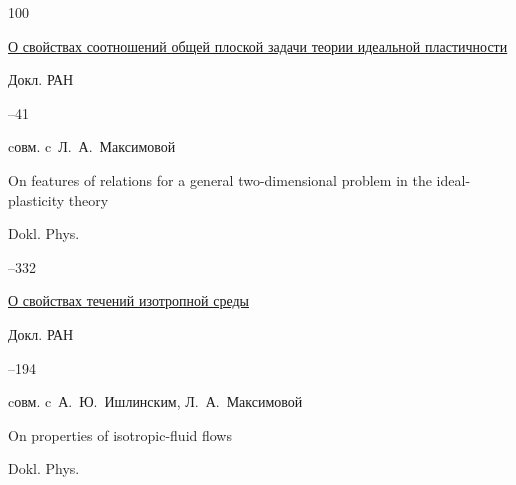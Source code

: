 \begin{thebibliography}{100}





\paper \href{http://mi.mathnet.ru/dan17870}{О свойствах соотношений общей плоской задачи теории идеальной пластичности}

\jour Докл. РАН




--41


\miscnote cовм. c~Л.~А.~Максимовой

\transl

\paper On features of relations for a general two-dimensional problem in the ideal-plasticity theory

\jour Dokl. Phys. 




--332








\paper \href{http://mi.mathnet.ru/dan2596}{О свойствах течений изотропной среды}

\jour Докл. РАН




--194

\miscnote cовм. c~А.~Ю.~Ишлинским, Л.~А.~Максимовой



\transl

\paper  On properties of isotropic-fluid flows



\jour Dokl. Phys.


\end{thebibliography}
